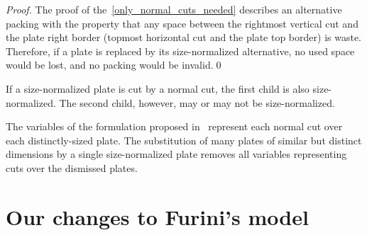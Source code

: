 \documentclass[runningheads]{llncs}
\begin{document}
\begin{proof}
The proof of the~\autoref{only_normal_cuts_needed} describes an alternative packing with the property that any space between the rightmost vertical cut and the plate right border (topmost horizontal cut and the plate top border) is waste. Therefore, if a plate is replaced by its size-normalized alternative, no used space would be lost, and no packing would be invalid.\qed
\end{proof}

\begin{remark}
If a size-normalized plate is cut by a normal cut, the first child is also size-normalized. The second child, however, may or may not be size-normalized.
\end{remark}



The variables of the formulation proposed in~\cite{furini:2016} represent each normal cut over each distinctly-sized plate.
The substitution of many plates of similar but distinct dimensions by a single size-normalized plate removes all variables representing cuts over the dismissed plates.

\section{Our changes to Furini's model}

% 
\end{document}
